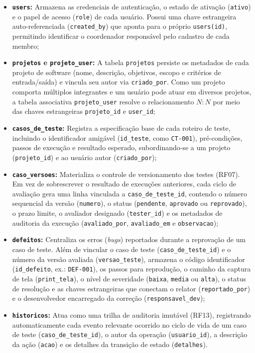 \begin{itemize}
    \item \textbf{\texttt{users}:} Armazena as credenciais de autenticação, o estado de ativação (\texttt{ativo}) e o papel de acesso (\texttt{role}) de cada usuário. Possui uma chave estrangeira auto-referenciada (\texttt{created\_by}) que aponta para o próprio \texttt{users(id)}, permitindo identificar o coordenador responsável pelo cadastro de cada membro;
    \item \textbf{\texttt{projetos} e \texttt{projeto\_user}:} A tabela \texttt{projetos} persiste os metadados de cada projeto de software (nome, descrição, objetivos, escopo e critérios de entrada/saída) e vincula seu autor via \texttt{criado\_por}. Como um projeto comporta múltiplos integrantes e um usuário pode atuar em diversos projetos, a tabela associativa \texttt{projeto\_user} resolve o relacionamento $N:N$ por meio das chaves estrangeiras \texttt{projeto\_id} e \texttt{user\_id};
    \item \textbf{\texttt{casos\_de\_teste}:} Registra a especificação base de cada roteiro de teste, incluindo o identificador amigável (\texttt{id\_teste}, como \texttt{CT-001}), pré-condições, passos de execução e resultado esperado, subordinando-se a um projeto (\texttt{projeto\_id}) e ao usuário autor (\texttt{criado\_por});
    \item \textbf{\texttt{caso\_versoes}:} Materializa o controle de versionamento dos testes (RF07). Em vez de sobrescrever o resultado de execuções anteriores, cada ciclo de avaliação gera uma linha vinculada a \texttt{caso\_de\_teste\_id}, contendo o número sequencial da versão (\texttt{numero}), o status (\texttt{pendente}, \texttt{aprovado} ou \texttt{reprovado}), o prazo limite, o avaliador designado (\texttt{tester\_id}) e os metadados de auditoria da execução (\texttt{avaliado\_por}, \texttt{avaliado\_em} e \texttt{observacao});
    \item \textbf{\texttt{defeitos}:} Centraliza os erros (\textit{bugs}) reportados durante a reprovação de um caso de teste. Além de vincular o caso de teste (\texttt{caso\_de\_teste\_id}) e o número da versão avaliada (\texttt{versao\_teste}), armazena o código identificador (\texttt{id\_defeito}, ex.: \texttt{DEF-001}), os passos para reprodução, o caminho da captura de tela (\texttt{print\_tela}), o nível de severidade (\texttt{baixa}, \texttt{media} ou \texttt{alta}), o status de resolução e as chaves estrangeiras que conectam o relator (\texttt{reportado\_por}) e o desenvolvedor encarregado da correção (\texttt{responsavel\_dev});
    \item \textbf{\texttt{historicos}:} Atua como uma trilha de auditoria imutável (RF13), registrando automaticamente cada evento relevante ocorrido no ciclo de vida de um caso de teste (\texttt{caso\_de\_teste\_id}), o autor da operação (\texttt{usuario\_id}), a descrição da ação (\texttt{acao}) e os detalhes da transição de estado (\texttt{detalhes}).
\end{itemize}

